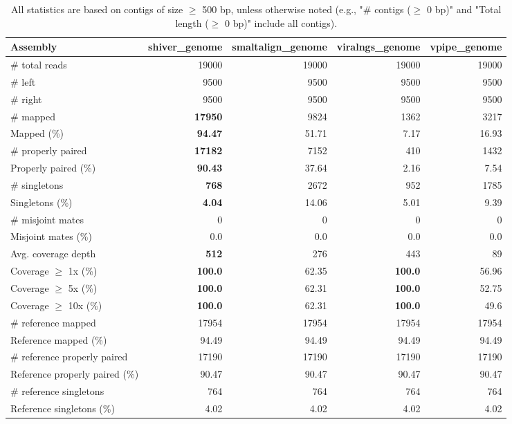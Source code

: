 \documentclass[12pt,a4paper]{article}
\begin{document}
\begin{table}[ht]
\begin{center}
\caption{All statistics are based on contigs of size $\geq$ 500 bp, unless otherwise noted (e.g., "\# contigs ($\geq$ 0 bp)" and "Total length ($\geq$ 0 bp)" include all contigs).}
\begin{tabular}{|l*{4}{|r}|}
\hline
Assembly & shiver\_genome & smaltalign\_genome & viralngs\_genome & vpipe\_genome \\ \hline
\# total reads & 19000 & 19000 & 19000 & 19000 \\ \hline
\# left & 9500 & 9500 & 9500 & 9500 \\ \hline
\# right & 9500 & 9500 & 9500 & 9500 \\ \hline
\# mapped & {\bf 17950} & 9824 & 1362 & 3217 \\ \hline
Mapped (\%) & {\bf 94.47} & 51.71 & 7.17 & 16.93 \\ \hline
\# properly paired & {\bf 17182} & 7152 & 410 & 1432 \\ \hline
Properly paired (\%) & {\bf 90.43} & 37.64 & 2.16 & 7.54 \\ \hline
\# singletons & {\bf 768} & 2672 & 952 & 1785 \\ \hline
Singletons (\%) & {\bf 4.04} & 14.06 & 5.01 & 9.39 \\ \hline
\# misjoint mates & 0 & 0 & 0 & 0 \\ \hline
Misjoint mates (\%) & 0.0 & 0.0 & 0.0 & 0.0 \\ \hline
Avg. coverage depth & {\bf 512} & 276 & 443 & 89 \\ \hline
Coverage $\geq$ 1x (\%) & {\bf 100.0} & 62.35 & {\bf 100.0} & 56.96 \\ \hline
Coverage $\geq$ 5x (\%) & {\bf 100.0} & 62.31 & {\bf 100.0} & 52.75 \\ \hline
Coverage $\geq$ 10x (\%) & {\bf 100.0} & 62.31 & {\bf 100.0} & 49.6 \\ \hline
\# reference mapped & 17954 & 17954 & 17954 & 17954 \\ \hline
Reference mapped (\%) & 94.49 & 94.49 & 94.49 & 94.49 \\ \hline
\# reference properly paired & 17190 & 17190 & 17190 & 17190 \\ \hline
Reference properly paired (\%) & 90.47 & 90.47 & 90.47 & 90.47 \\ \hline
\# reference singletons & 764 & 764 & 764 & 764 \\ \hline
Reference singletons (\%) & 4.02 & 4.02 & 4.02 & 4.02 \\ \hline

\end{tabular}
\end{center}
\end{table}
\end{document}
